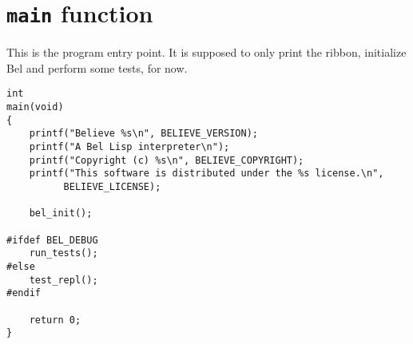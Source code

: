 \documentclass[openright,a4paper,twoside,12pt]{memoir}
\begin{document}
\section{\texttt{main} function}
\label{sec:orge26666e}

This is the program entry point. It is supposed to only print the
ribbon, initialize Bel and perform some tests, for now.

\begin{verbatim}
int
main(void)
{
    printf("Believe %s\n", BELIEVE_VERSION);
    printf("A Bel Lisp interpreter\n");
    printf("Copyright (c) %s\n", BELIEVE_COPYRIGHT);
    printf("This software is distributed under the %s license.\n",
          BELIEVE_LICENSE);

    bel_init();

#ifdef BEL_DEBUG
    run_tests();
#else
    test_repl();
#endif
    
    return 0;
}
\end{verbatim}
\end{document}
